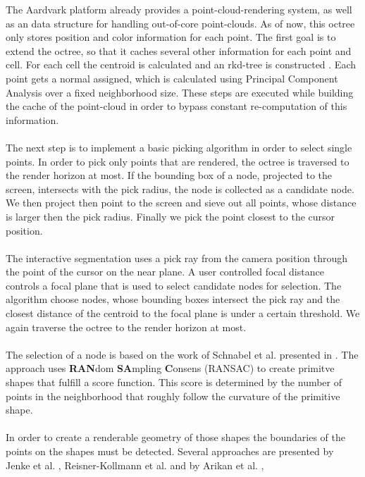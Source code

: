 \documentclass[]{article}
\begin{document}
The Aardvark platform already provides a point-cloud-rendering system, as well as an data structure for handling out-of-core point-clouds. As of now, this octree only stores position and color information for each point. The first goal is to extend the octree, so that it caches several other information for each point and cell.  For each cell the centroid is calculated and an rkd-tree is constructed \cite{tobler2011rkd}. Each point gets a normal assigned, which is calculated using Principal Component Analysis \cite{jolliffe2002principal} over a fixed neighborhood size. These steps are executed while building the cache of the point-cloud in order to bypass constant re-computation of this information. 
\\
\\
The next step is to implement a basic picking algorithm in order to select single points. In order to pick only points that are rendered, the octree is traversed to the render horizon at most. If the bounding box of a node, projected to the screen, intersects with the pick radius, the node is collected as a candidate node. We then project then point to the screen and sieve out all points, whose distance is larger then the pick radius. Finally we pick the point closest to the cursor position. 
\\
\\
The interactive segmentation uses a pick ray from the camera position through the point of the cursor on the near plane. A user controlled focal distance controls a focal plane that is used to select candidate nodes for selection. The algorithm choose nodes, whose bounding boxes intersect the pick ray and the closest distance of the centroid to the focal plane is under a certain threshold. We again traverse the octree to the render horizon at most.
\\
\\
The selection of a node is based on the work of Schnabel et al. presented in \cite{schnabel-2007-efficient}. The approach uses \textbf{RAN}dom \textbf{SA}mpling \textbf{C}onsens (RANSAC) \cite{fischler1981random} to create primitve shapes that fulfill a score function. This score is determined by the number of points in the neighborhood that roughly follow the curvature of the primitive shape.
\\
\\
In order to create a renderable geometry of those shapes the boundaries of the points on the shapes must be detected. Several approaches are presented by Jenke et al. \cite{jenke2008surface}, Reisner-Kollmann et al. \cite{reisner2013reconstructing} and by Arikan et al. \cite{arikan-2013-osn}, 
\\
\\
\end{document}
